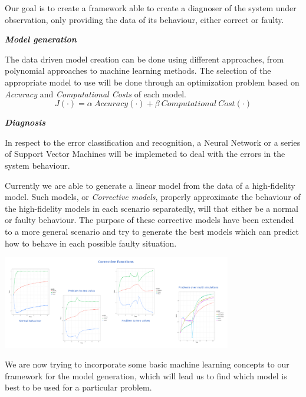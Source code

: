 \documentclass{tikzposter}
\begin{document}
	{
		Our goal is to create a framework able to create a diagnoser of the
		system under observation, only providing the data of its behaviour,
		either correct or faulty. \\
		
		\begin{minipage}[t]{0.43\textwidth}
			\begin{center}
				\textbf{\textit{Model generation}}
			\end{center}
			The data driven model creation can be done using different
			approaches, from polynomial approaches to machine learning methods.
			The selection of the appropriate model to use will be done through
			an optimization problem based on \emph{Accuracy} and
			\emph{Computational Costs} of each model.
			$$ J(\cdot) = \alpha\ Accuracy(\cdot) + \beta\ Computational\ Cost(\cdot) $$
		\end{minipage}
		\hspace{15mm}
		\begin{minipage}[t]{0.43\textwidth}
			\begin{center}
				\textbf{\textit{Diagnosis}}
			\end{center}
			In respect to the error classification and recognition, a Neural
			Network or a series of Support Vector Machines will be implemeted to
			deal with the errors in the system behaviour.
		\end{minipage}
	}

	{
		Currently we are able to generate a linear model from the data of a
		high-fidelity model.
		Such models, or \emph{Corrective models}, properly approximate the
		behaviour of the high-fidelity models in each scenario separatedly, will
		that either be a normal or faulty behaviour.  
		The purpose of these corrective models have been extended to a more
		general scenario and try to generate the best models which can predict
		how to behave in each possible faulty situation.

		\begin{center}
			\includegraphics[width=0.75\textwidth]{./Images/Corrective_functions.png}
		\end{center}
	}

	{
		We are now trying to incorporate some basic machine learning concepts to
		our framework for the model generation, which will lead us to find which
		model is best to be used for a particular problem.
	}
\end{document}
